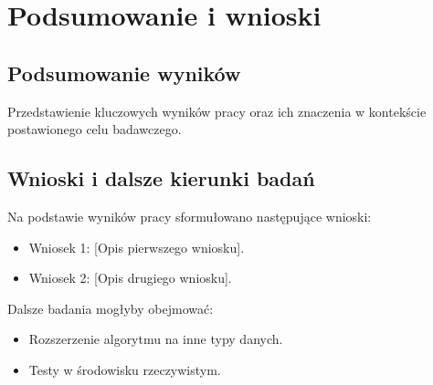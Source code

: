 \chapter{Podsumowanie i wnioski}

\section{Podsumowanie wyników}
Przedstawienie kluczowych wyników pracy oraz ich znaczenia w kontekście postawionego celu badawczego.

\section{Wnioski i dalsze kierunki badań}
Na podstawie wyników pracy sformułowano następujące wnioski:
\begin{itemize}
    \item Wniosek 1: [Opis pierwszego wniosku].
    \item Wniosek 2: [Opis drugiego wniosku].
\end{itemize}
Dalsze badania mogłyby obejmować:
\begin{itemize}
    \item Rozszerzenie algorytmu na inne typy danych.
    \item Testy w środowisku rzeczywistym.
\end{itemize}
